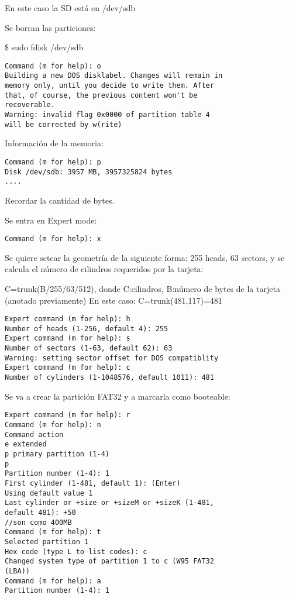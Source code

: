En este caso la SD está en /dev/sdb 

\bigskip
Se borran las particiones: 

\centerline{\$ sudo fdisk /dev/sdb}

\bigskip
\begin{verbatim}
Command (m for help): o 
Building a new DOS disklabel. Changes will remain in 
memory only, until you decide to write them. After 
that, of course, the previous content won't be 
recoverable. 
Warning: invalid flag 0x0000 of partition table 4 
will be corrected by w(rite) 
\end{verbatim}

Información de la memoria: 

\begin{verbatim}
Command (m for help): p 
Disk /dev/sdb: 3957 MB, 3957325824 bytes 
.... 
\end{verbatim}

Recordar la cantidad de bytes.

\bigskip
Se entra en Expert mode: 

\bigskip
\begin{verbatim}
Command (m for help): x 
\end{verbatim}

Se quiere setear la geometría de la siguiente forma: 255 heads, 63 sectors, y se calcula el 
número de cilindros requeridos por la tarjeta: 

\bigskip
C=trunk(B/255/63/512), donde C:cilindros, B:número de bytes de la tarjeta (anotado previamente) 
En este caso: C=trunk(481,117)=481 

\begin{verbatim}
Expert command (m for help): h 
Number of heads (1-256, default 4): 255 
Expert command (m for help): s 
Number of sectors (1-63, default 62): 63 
Warning: setting sector offset for DOS compatiblity 
Expert command (m for help): c 
Number of cylinders (1-1048576, default 1011): 481 
\end{verbatim}


Se va a crear la partición FAT32 y a marcarla como booteable: 

\begin{verbatim}
Expert command (m for help): r 
Command (m for help): n 
Command action 
e extended 
p primary partition (1-4) 
p 
Partition number (1-4): 1 
First cylinder (1-481, default 1): (Enter) 
Using default value 1 
Last cylinder or +size or +sizeM or +sizeK (1-481, 
default 481): +50 
//son como 400MB 
Command (m for help): t 
Selected partition 1 
Hex code (type L to list codes): c 
Changed system type of partition 1 to c (W95 FAT32 
(LBA)) 
Command (m for help): a 
Partition number (1-4): 1 
\end{verbatim}

